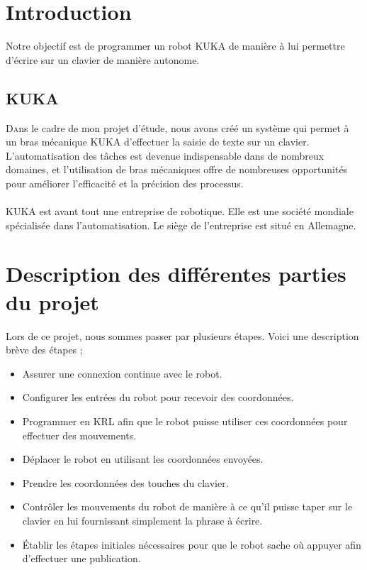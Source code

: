 \section{Introduction}

Notre objectif est de programmer un robot KUKA de manière à lui permettre d'écrire sur un clavier de manière autonome.

\subsection{KUKA}

\lettrine[nindent=0em,lines=3]{D}ans le cadre de mon projet d'étude, nous avons créé un système qui permet à un bras mécanique KUKA d'effectuer la saisie de texte sur un clavier. 
L'automatisation des tâches est devenue indispensable dans de nombreux domaines, et l'utilisation de bras mécaniques offre de nombreuses opportunités pour améliorer l'efficacité et la précision des processus.
\\
\\
KUKA est avant tout une entreprise de robotique.
Elle est une société mondiale spécialisée dans l'automatisation.
Le siège de l'entreprise est situé en Allemagne.

\section{Description des différentes parties du projet}

Lors de ce projet, nous sommes passer par plusieurs étapes.
Voici une description brève des étapes ;

\begin{itemize}
    \item Assurer une connexion continue avec le robot.
    \item Configurer les entrées du robot pour recevoir des coordonnées.
    \item Programmer en KRL afin que le robot puisse utiliser ces coordonnées pour effectuer des mouvements.
    \item Déplacer le robot en utilisant les coordonnées envoyées.
    \item Prendre les coordonnées des touches du clavier.
    \item Contrôler les mouvements du robot de manière à ce qu'il puisse taper sur le clavier en lui fournissant simplement la phrase à écrire.
    \item Établir les étapes initiales nécessaires pour que le robot sache où appuyer afin d'effectuer une publication.
\end{itemize}


